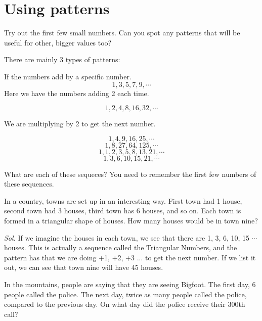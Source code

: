 \documentclass{article}
\theoremstyle{mytheoremstyle}
\theoremstyle{mytheoremstyle}
\theoremstyle{myproblemstyle}
\theoremstyle{myproblemstyle}
\begin{document}
    \section{Using patterns}
    Try out the first few small numbers. Can you spot any patterns that will be useful for other, bigger values too?

    There are mainly 3 types of patterns:

    \begin{theorem}[differences]
        If the numbers add by a specific number.
        \[1, 3, 5, 7, 9, \cdots \]
        Here we have the numbers adding 2 each time.
    \end{theorem}

    \begin{theorem}[ratio]
        \[1, 2, 4, 8, 16, 32, \cdots\]

        We are multiplying by 2 to get the next number.
    \end{theorem}

    \begin{theorem}
        \[1, 4, 9, 16, 25, \cdots\]
        \[1, 8, 27, 64, 125, \cdots\]
        \[1, 1, 2, 3, 5, 8, 13, 21, \cdots\]
        \[1, 3, 6, 10, 15, 21, \cdots\]

        What are each of these sequeces? You need to remember the first few numbers of these sequences.
    \end{theorem}

    \begin{example}
        In a country, towns are set up in an interesting way. First town had 1 house, second town had 3 houses, third town has 6 houses, and so on. Each town is formed in a triangular shape of houses. How many houses would be in town nine?
    \end{example}

    \textit{ Sol. } If we imagine the houses in each town, we see that there are 1, 3, 6, 10, 15 $\cdots$ houses. This is actually a sequence called the Triangular Numbers, and the pattern has that we are doing +1, +2, +3 ... to get the next number. If we list it out, we can see that town nine will have 45 houses.

    \begin{problem}
        In the mountains, people are saying that they are seeing Bigfoot. The first day, 6 people called the police. The next day, twice as many people called the police, compared to the previous day. On what day did the police receive their 300th call?
    \end{problem}
\end{document}
